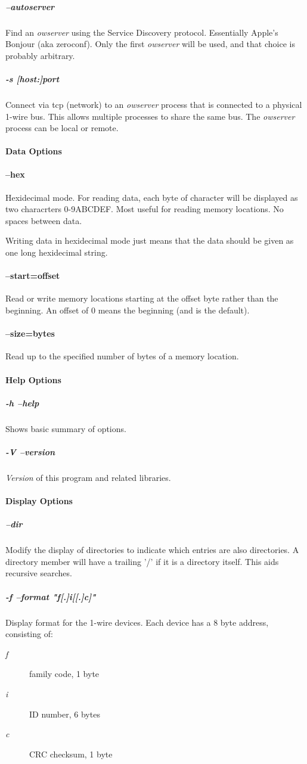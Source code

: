 \subparagraph*{--autoserver}Find
an  \textit{owserver} using the Service Discovery protocol. Essentially Apple's Bonjour
(aka zeroconf). Only the first  \textit{owserver}  will be used, and that choice
is probably arbitrary. 
\subparagraph*{-s [host:]port}Connect via tcp (network) to an \textit{owserver}
process that is connected to a physical 1-wire bus. This allows multiple
processes to share the same bus. The \textit{owserver} process can be local or remote.

\paragraph*{Data Options}

\paragraph*{--hex}
Hexidecimal mode. For reading data, each byte of character
will be displayed as two characrters 0-9ABCDEF. Most useful for reading memory
locations. No spaces between data. 

Writing data in hexidecimal mode just
means that the data should be given as one long hexidecimal string. 
\paragraph*{--start=offset}
Read
or write memory locations starting at the offset byte rather than the beginning.
An offset of 0 means the beginning (and is the default). 


\paragraph*{--size=bytes}
Read
up to the specified number of bytes of a memory location. 
\paragraph*{Help Options}

\subparagraph*{-h
--help}Shows basic summary of options. 
\subparagraph*{-V --version}\textit{Version} of this program and
related libraries. 
\paragraph*{Display Options}

\subparagraph*{--dir}Modify the display of directories to
indicate which entries are also directories. A directory member will have
a trailing '/' if it is a directory itself. This aids recursive searches. 
\subparagraph*{-f
--format "f[.]i[[.]c]"}Display format for the 1-wire devices. Each device has
a 8 byte address, consisting of: \begin{description}
\item [\textit{f} ] family code, 1 byte 
\item [\textit{i} ] ID number, 6 bytes

\item [\textit{c} ] CRC checksum, 1 byte 
\end{description}


